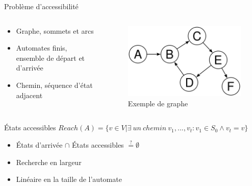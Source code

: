 \documentclass{bredelebeamer}
\begin{document}
\begin{frame}{Problème d'accessibilité}

\begin{columns}

\begin{column}{0.5\textwidth}
\begin{itemize}
\item Graphe, sommets et arcs
\item Automates finis, ensemble de départ et d'arrivée
\item Chemin, séquence d'état adjacent
\end{itemize}
\end{column}
\begin{column}{0.45\textwidth}
\begin{figure}
\includegraphics[scale = 0.3]{images/dgraph.png}
\caption{Exemple de graphe}
\end{figure}
\end{column}

\end{columns}


\begin{block}{États accessibles}
\centering
$Reach(A) = \{v \in V | \exists\ un\ chemin\ v_1,...,v_t : v_1 \in S_0 \wedge v_t = v\}$
\end{block}


\begin{itemize}
\item États d'arrivée $\cap$ États accessibles $\stackrel{?}{=} \emptyset$
\item Recherche en largeur
\item Linéaire en la taille de l'automate
\end{itemize}


\end{frame}
\end{document}
